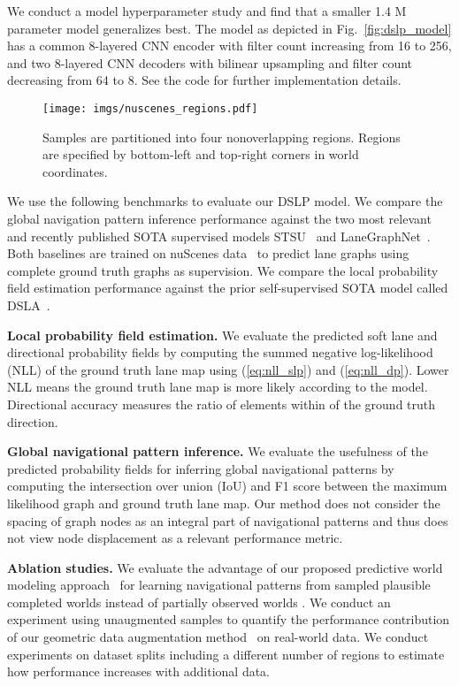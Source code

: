 \documentclass[letterpaper, 10 pt, conference]{ieeeconf}
\begin{document}
We conduct a model hyperparameter study and find that a smaller 1.4 M parameter model generalizes best. The model as depicted in Fig.~\ref{fig:dslp_model} has a common 8-layered CNN encoder with filter count increasing from 16 to 256, and two 8-layered CNN decoders with bilinear upsampling and filter count decreasing from 64 to 8.
See the code for further implementation details.

\begin{figure}[t]\centering
\texttt{[image: imgs/nuscenes\_regions.pdf]}
\caption{Samples are partitioned into four nonoverlapping regions. Regions are specified by bottom-left and top-right corners in world coordinates.}
\label{fig:nuscenes_regions}
\vspace{-6mm}
\end{figure}

We use the following benchmarks to evaluate our DSLP model. We compare the global navigation pattern inference performance against the two most relevant and recently published SOTA supervised models STSU~\cite{can2021stsu} and LaneGraphNet~\cite{zurn2021lanegraphnet}. Both baselines are trained on nuScenes data~\cite{caesar2020nuscenes} to predict lane graphs using complete ground truth graphs as supervision. We compare the local probability field estimation performance against the prior self-supervised SOTA model called DSLA~\cite{karlsson2020dsla}.

\textbf{Local probability field estimation.}
We evaluate the predicted soft lane  and directional  probability fields by computing the summed negative log-likelihood (NLL) of the ground truth lane map using (\ref{eq:nll_slp}) and (\ref{eq:nll_dp}). Lower NLL means the ground truth lane map is more likely according to the model. Directional accuracy measures the ratio of elements within  of the ground truth direction.

\textbf{Global navigational pattern inference.}
We evaluate the usefulness of the predicted probability fields for inferring global navigational patterns by computing the intersection over union (IoU) and F1 score between the maximum likelihood graph and ground truth lane map.
Our method does not consider the spacing of graph nodes as an integral part of navigational patterns and thus does not view node displacement as a relevant performance metric.


\textbf{Ablation studies.}
We evaluate the advantage of our proposed predictive world modeling approach~\cite{karlsson2023pred_wm} for learning navigational patterns from sampled plausible completed worlds  instead of partially observed worlds . We conduct an experiment using unaugmented samples to quantify the performance contribution of our geometric data augmentation method~\cite{karlsson2020dsla} on real-world data.
We conduct experiments on dataset splits including a different number of regions to estimate how performance increases with additional data.
\end{document}

